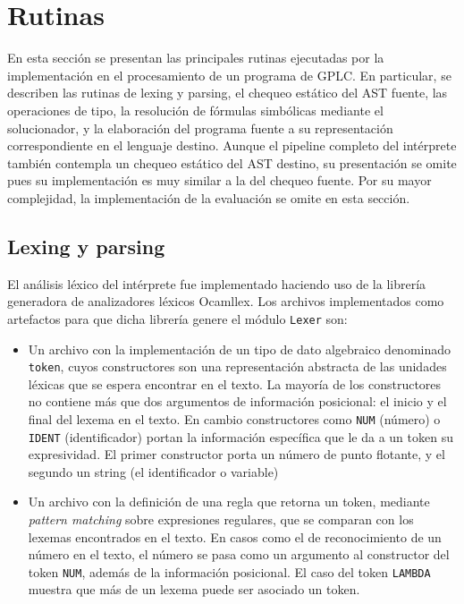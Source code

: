 \section{Rutinas} En esta sección se presentan las principales rutinas
ejecutadas por la implementación en el procesamiento de un programa de
GPLC. En particular, se describen las rutinas de lexing y parsing, el
chequeo estático del AST fuente, las operaciones de tipo, la
resolución de fórmulas simbólicas mediante el solucionador, y la elaboración
del programa fuente a su representación correspondiente en el lenguaje
destino. Aunque el pipeline completo del intérprete también contempla
un chequeo estático del AST destino, su presentación se omite pues su
implementación es muy similar a la del chequeo fuente. Por su mayor
complejidad, la implementación de la evaluación se omite en esta
sección.

\subsection{Lexing y parsing}

El análisis léxico del intérprete fue implementado haciendo uso de la
librería generadora de analizadores léxicos Ocamllex. Los
archivos implementados como artefactos para que dicha librería genere
el módulo \verb|Lexer| son:
\begin{itemize}
\item Un archivo con la implementación de un tipo de dato algebraico
  denominado \verb|token|, cuyos constructores son una representación
  abstracta de las unidades léxicas que se espera encontrar en el
  texto. La mayoría de los constructores no contiene más que dos
  argumentos de información posicional: el inicio y el final del
  lexema en el texto. En cambio constructores como \verb|NUM| (número) o
  \verb|IDENT| (identificador) portan la información específica que le da
  a un token su expresividad. El primer constructor porta un número de punto
  flotante, y el segundo un string (el identificador o variable)
\item Un archivo con la definición de una regla que retorna un token,
  mediante \emph{pattern matching} sobre expresiones regulares, que se
  comparan con los lexemas encontrados en el texto. En casos como el de
  reconocimiento de un número en el texto, el número se pasa como un argumento
  al constructor del token \verb|NUM|, además de la información posicional.
  El caso del token \verb|LAMBDA| muestra que más de un lexema puede ser asociado
  un token.
\end{itemize}

